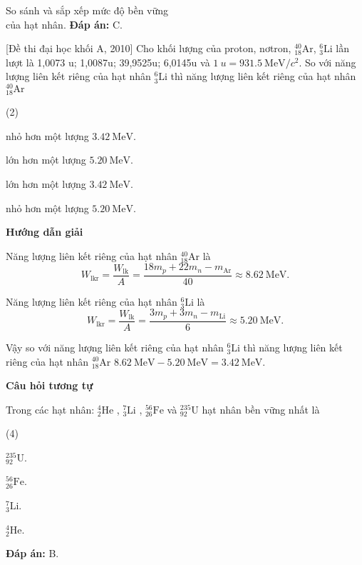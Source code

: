 \begin{dang}{So sánh và sắp xếp mức độ bền vững\\ của hạt nhân.}
{\textbf{Đáp án:} C.
}

{[Đề thi đại học khối A, 2010] Cho khối lượng của proton, nơtron, $^{40}_{18}\text{Ar}$, $^{6}_{3}\text{Li}$ lần lượt là 1,0073 u; 1,0087u; 39,9525u; 6,0145u và $\SI{1}{u}=\SI{931,5}{\mega\electronvolt/c^2}$. So với năng lượng liên kết riêng của hạt nhân $^{6}_{3}\text{Li}$ thì năng lượng liên kết riêng của hạt nhân $^{40}_{18}\text{Ar}$
	\begin{mcq}(2)
		\item nhỏ hơn một lượng $\SI{3,42}{\mega\electronvolt}$.
		\item lớn hơn một lượng $\SI{5,20}{\mega\electronvolt}$.
		\item lớn hơn một lượng $\SI{3,42}{\mega\electronvolt}$.
		\item nhỏ hơn một lượng $\SI{5,20}{\mega\electronvolt}$.
	\end{mcq}}
	{
	\begin{center}
		\textbf{Hướng dẫn giải}
	\end{center}

	Năng lượng liên kết riêng của hạt nhân $^{40}_{18}\text{Ar}$ là
	\begin{equation*}
		W_\text{lkr}=\dfrac{W_\text{lk}}{A}= \dfrac{18 m_p+ 22 m_n - m_\text{Ar}}{40}\approx \SI{8,62}{\mega\electronvolt}.
	\end{equation*}
	
	Năng lượng liên kết riêng của hạt nhân $^{6}_{3}\text{Li}$ là
	\begin{equation*}
	W_\text{lkr}=\dfrac{W_\text{lk}}{A}= \dfrac{3 m_p+ 3 m_n - m_\text{Li}}{6}\approx \SI{5,20}{\mega\electronvolt}.
	\end{equation*}
	
	Vậy so với năng lượng liên kết riêng của hạt nhân $^{6}_{3}\text{Li}$ thì năng lượng liên kết riêng của hạt nhân $^{40}_{18}\text{Ar}$ $\SI{8,62}{\mega\electronvolt} - \SI{5,20}{\mega\electronvolt} = \SI{3,42}{\mega\electronvolt}.$
	
	\begin{center}
		\textbf{Câu hỏi tương tự}
	\end{center}
	
Trong các hạt nhân: $ ^{4}_{2} \text{He} $ , $ ^{7}_{3} \text{Li} $ , $ ^{56}_{26} \text{Fe} $ và $ ^{235}_{92} \text{U} $ hạt nhân bền vững nhất là
\begin{mcq}(4)
	\item $ ^{235}_{92} \text{U} $.
	\item $ ^{56}_{26} \text{Fe} $.
	\item $ ^{7}_{3} \text{Li} $.
	\item $ ^{4}_{2} \text{He} $.
\end{mcq}
	
	\textbf{Đáp án:} B.
}

\end{dang}
